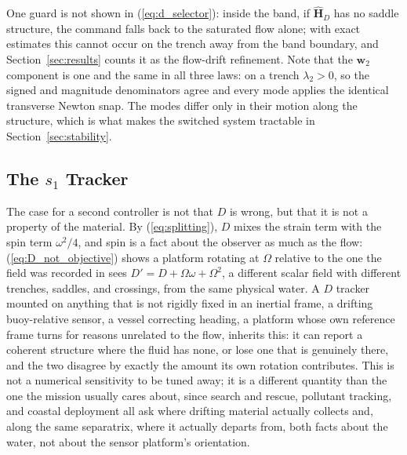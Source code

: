 \documentclass[lettersize,journal]{IEEEtran}
\begin{document}
One guard is not shown in (\ref{eq:d_selector}): inside the band, if $\hat{\mathbf{H}}_D$ has no
saddle structure, the command falls back to the saturated flow alone;
with exact estimates this cannot occur on the trench away from the band
boundary, and Section~\ref{sec:results} counts it as the flow-drift
refinement. Note that the $\mathbf{w}_2$ component is one and the same
in all three laws: on a trench $\lambda_2 > 0$, so the signed and
magnitude denominators agree and every mode applies the identical
transverse Newton snap. The modes differ only in their motion along the
structure, which is what makes the switched system tractable in
Section~\ref{sec:stability}.

\subsection{The $s_1$ Tracker}
\label{sec:oecs_controller}

The case for a second controller is not that $D$ is wrong, but that it
is not a property of the material. By (\ref{eq:splitting}), $D$ mixes
the strain term with the spin term $\omega^2/4$, and spin is a fact
about the observer as much as the flow: (\ref{eq:D_not_objective})
shows a platform rotating at $\Omega$ relative to the one the field was
recorded in sees $D' = D + \Omega\omega + \Omega^2$, a different
scalar field with different trenches, saddles, and crossings, from the
same physical water. A $D$ tracker mounted on anything that is not
rigidly fixed in an inertial frame, a drifting buoy-relative sensor, a
vessel correcting heading, a platform whose own reference frame turns
for reasons unrelated to the flow, inherits this: it can report a
coherent structure where the fluid has none, or lose one that is
genuinely there, and the two disagree by exactly the amount its own
rotation contributes. This is not a numerical sensitivity to be tuned
away; it is a different quantity than the one the mission usually
cares about, since search and rescue, pollutant tracking, and coastal
deployment all ask where drifting material actually collects and,
along the same separatrix, where it actually departs from, both facts
about the water, not about the sensor platform's orientation.
\end{document}
